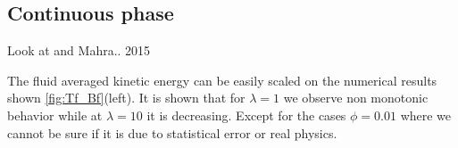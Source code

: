 \subsection{Continuous phase}
Look at \citep{wang2021numerical} and Mahra.. 2015 



The fluid averaged kinetic energy can be easily scaled on the numerical results shown \ref{fig:Tf_Bf}(left).
It is shown that for $\lambda= 1$ we observe non monotonic behavior while at $\lambda= 10$ it is decreasing.
Except for the cases $\phi = 0.01$ where we cannot be sure if it is due to statistical error or real physics. 
